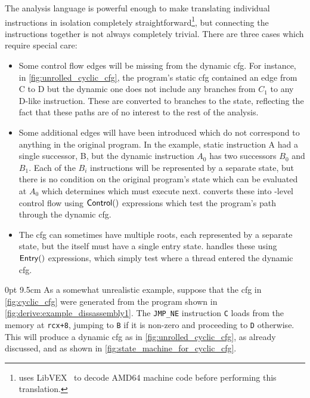 The {\StateMachine} analysis language is powerful enough to make
translating individual instructions in isolation completely
straightforward\footnote{{\Implementation} uses LibVEX~\cite[Chapter
    2]{FFFSeward2012} to decode AMD64 machine code before performing
  this translation.}\!\!, but connecting the instructions together is
not always completely trivial.  There are three cases which require
special care:
\begin{itemize}
\item
  Some control flow edges will be missing from the \gls{dynamic cfg}.
  For instance, in \autoref{fig:unrolled_cyclic_cfg}, the program's
  \gls{static cfg} contained an edge from C to D but the dynamic one
  does not include any branches from $C_1$ to any D-like instruction.
  These are converted to branches to the {\stUnreached} state,
  reflecting the fact that these paths are of no interest to the rest
  of the analysis.
\item
  Some additional edges will have been introduced which do not
  correspond to anything in the original program.  In the example,
  static instruction A had a single successor, B, but the dynamic
  instruction $A_0$ has two successors $B_0$ and $B_1$.  Each of the
  $B_i$ instructions will be represented by a separate {\StateMachine}
  state, but there is no condition on the original program's state
  which can be evaluated at $A_0$ which determines which must execute
  next.  {\Technique} converts these into {\StateMachine}-level
  control flow using ${\mathsf{Control}}()$ expressions which test the
  program's path through the \gls{dynamic cfg}.
\item
  The \gls{cfg} can sometimes have multiple roots, each represented by
  a separate {\StateMachine} state, but the {\StateMachine} itself
  must have a single entry state.  {\Technique} handles these using
  $\mathsf{Entry}()$ expressions, which simply test where a thread entered
  the \gls{dynamic cfg}.
\end{itemize}

  0pt 9.5cm
\noindent As a somewhat unrealistic example, suppose that the
\gls{cfg} in \autoref{fig:cyclic_cfg} were generated from the program
shown in \autoref{fig:derive:example_dissassembly1}.  The
\texttt{JMP\_NE} instruction \texttt{C} loads from the memory at
\texttt{rcx+8}, jumping to \texttt{B} if it is non-zero and proceeding
to \texttt{D} otherwise.  This will produce a \gls{dynamic cfg} as in
\autoref{fig:unrolled_cyclic_cfg}, as already discussed, and
\AStateMachine{} as shown in
\autoref{fig:state_machine_for_cyclic_cfg}.


